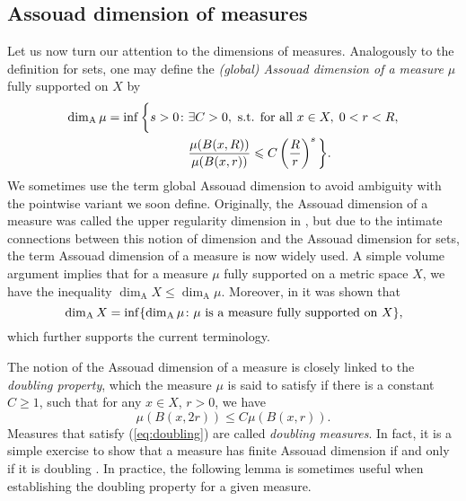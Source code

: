 \documentclass{PRM}
\newcommand{\adim}{\dim_{\mathrm{A}}}
\theoremstyle{plain}
\theoremstyle{definition}
\theoremstyle{remark}
\begin{document}
\subsection{Assouad dimension of measures}
Let us now turn our attention to the dimensions of measures. Analogously to the definition for sets, one may define the \emph{(global) Assouad dimension of a measure $\mu$} fully supported on $X$ by
\begin{align*}
    \adim \mu=\inf\bigg\{ s>0\colon& \exists C>0,\textnormal{ s.t. for all }x\in X,\; 0<r<R,\\
    &\frac{\mu(B(x,R))}{\mu(B(x,r))}\leq C\left(\frac{R}{r}\right)^s\bigg\}.
\end{align*}
We sometimes use the term global Assouad dimension to avoid ambiguity with the pointwise variant we soon define.
Originally, the Assouad dimension of a measure was called the upper regularity dimension in \cite{KLV}, but due to the intimate connections between this notion of dimension and the Assouad dimension for sets, the term Assouad dimension of a measure is now widely used. A simple volume argument implies that for a measure $\mu$ fully supported on a metric space $X$, we have the inequality $\adim X\leq \adim\mu$. Moreover, in \cite{VK, LS} it was shown that
\begin{equation*}
    \adim X=\inf\{\adim\mu\colon \mu\textnormal{ is a measure fully supported on }X\},
\end{equation*}
which further supports the current terminology.

The notion of the Assouad dimension of a measure is closely linked to the \emph{doubling property}, which the measure $\mu$ is said to satisfy if there is a constant $C\geq 1$, such that for any $x\in X$, $r>0$, we have
\begin{equation}\label{eq:doubling}
    \mu(B(x,2r))\leq C\mu(B(x,r)).
\end{equation}
Measures that satisfy (\ref{eq:doubling}) are called \emph{doubling measures}. In fact, it is a simple exercise to show that a measure has finite Assouad dimension if and only if it is doubling \cite[Lemma 4.1.1]{F}. In practice, the following lemma is sometimes useful when establishing the doubling property for a given measure.
\end{document}
